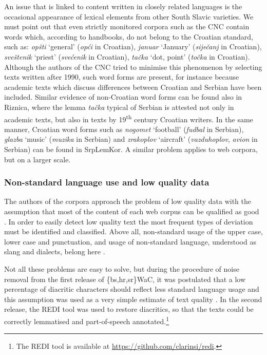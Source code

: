 An issue that is linked to content written in closely related languages is the occasional appearance of lexical elements from other South Slavic varieties. We must point out that even strictly monitored corpora such as the CNC contain words which, according to handbooks, do not belong to the Croatian standard, such as: \textit{opšti} `general' (\textit{opći} in Croatian), \textit{januar} `January' (\textit{siječanj} in Croatian), \textit{sveštenik} `priest' (\textit{svećenik} in Croatian), \textit{tačka} `dot, point' (\textit{točka} in Croatian). Although the authors of the CNC tried to minimise this phenomenon by selecting texts written after 1990, such word forms are present, for instance because academic texts which discuss differences between Croatian and Serbian have been included. Similar evidence of non-Croatian word forms can be found also in Riznica, where the lemma \textit{tačka} typical of Serbian is attested not only in academic texts, but also in texts by 19\textsuperscript{th} century Croatian writers. In the same manner, Croatian word forms such as \textit{nogomet} `football' (\textit{fudbal} in Serbian), \textit{glazba} `music' (\textit{muzika} in Serbian) and \textit{zrakoplov} `aircraft' (\textit{vazduhoplov}, \textit{avion} in Serbian) can be found in SrpLemKor. A similar problem applies to web corpora, but on a larger scale. 

\subsubsection{Non-standard language use and low quality data}

The authors of the corpora approach the problem of low quality data with the assumption that most of the content of each web corpus can be qualified as good \citep[33]{LjubesicKlubicka14}. In order to easily detect low quality text the most frequent types of deviation must be identified and classified. Above all, non-standard usage of the upper case, lower case and punctuation, and usage of non-standard language, understood as slang and dialects, belong here \citep[33]{LjubesicKlubicka14}. 

Not all these problems are easy to solve, but during the procedure of noise removal from the first release of \{bs,hr,sr\}WaC, it was postulated that a low percentage of diacritic characters should reflect less standard language usage and this assumption was used as a very simple estimate of text quality \citep[34]{LjubesicKlubicka14}. In the second release, the REDI tool was used to restore diacritics, so that the texts could be correctly lemmatised and part-of-speech annotated.\footnote{The REDI tool is available at \url{https://github.com/clarinsi/redi}.}

